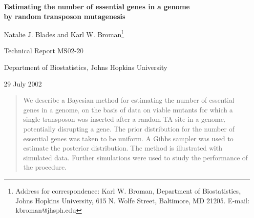 \documentclass[letterpaper]{article}
\begin{document}
\thispagestyle{empty}

\begin{center}
\large
\textbf{Estimating the number of essential genes 
  in a genome \\ by random transposon mutagenesis}

\bigskip

\renewcommand{\thefootnote}{\fnsymbol{footnote}}

Natalie J. Blades and 
Karl W. Broman\footnote[0]{Address for correspondence: Karl
  W. Broman, Department of Biostatistics, Johns Hopkins University,
  615 N. Wolfe Street, Baltimore, MD 21205. E-mail:
  kbroman@jhsph.edu}

\bigskip

\normalsize

Technical Report MS02-20 

\bigskip

Department of Biostatistics, Johns Hopkins University

\bigskip

29 July 2002

\bigskip

\begin{quote}
We describe a Bayesian method for estimating the number of essential
genes in a genome, on the basis of data on viable mutants for which a
single transposon was inserted after a random TA site in a genome,
potentially disrupting a gene.  The prior distribution for the number
of essential genes was taken to be uniform.  A Gibbs sampler was used
to estimate the posterior distribution.  The method is illustrated
with simulated data.  Further simulations were used to study the
performance of the procedure.
\end{quote}

\end{center}

\bigskip

\setlength{\columnsep}{0.25in}
\end{document}

